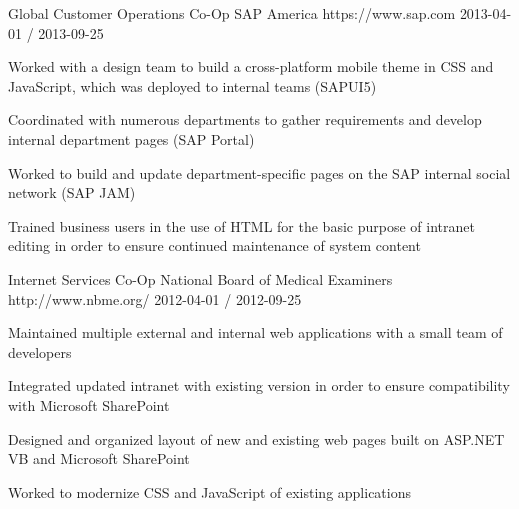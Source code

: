 \documentclass[11pt, a4paper]{awesome-cv}
\begin{document}
\begin{cventries}
  \cventry
    {Global Customer Operations Co-Op}
    {SAP America}
    {https://www.sap.com}
    {2013-04-01 / 2013-09-25}
    {
          \begin{cvitems}
                \item{Worked with a design team to build a cross-platform mobile theme in CSS and JavaScript, which was deployed to internal teams (SAPUI5)}
                \item{Coordinated with numerous departments to gather requirements and develop internal department pages (SAP Portal)}
                \item{Worked to build and update department-specific pages on the SAP internal social network (SAP JAM)}
                \item{Trained business users in the use of HTML for the basic purpose of intranet editing in order to ensure continued maintenance of system content}
          \end{cvitems}
    }
 
  \cventry
    {Internet Services Co-Op}
    {National Board of Medical Examiners}
    {http://www.nbme.org/}
    {2012-04-01 / 2012-09-25}
    {
          \begin{cvitems}
                \item{Maintained multiple external and internal web applications with a small team of developers}
                \item{Integrated updated intranet with existing version in order to ensure compatibility with Microsoft SharePoint}
                \item{Designed and organized layout of new and existing web pages built on ASP.NET VB and Microsoft SharePoint}
                \item{Worked to modernize CSS and JavaScript of existing applications}
          \end{cvitems}
    }
 

\end{cventries}
\end{document}
